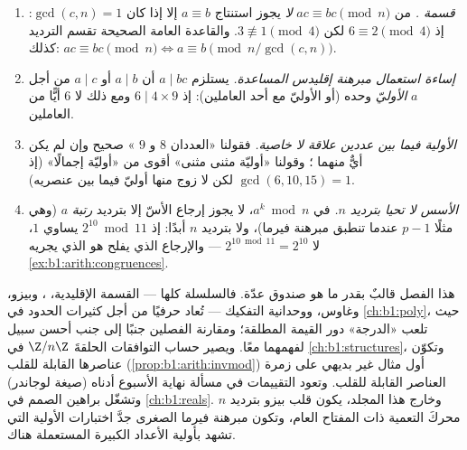 \begin{remark}\label{rem:b1:arith:pitfalls}
\begin{enumerate}
  \item \emph{قسمة .} من $ac \equiv bc \pmod n$
        \emph{لا} يجوز استنتاج $a \equiv b$ إلا إذا كان $\gcd(c,
        n) = 1$: إذ $6 \equiv 2 \pmod 4$ لكن $3 \not\equiv 1 \pmod
        4$. والقاعدة العامة الصحيحة تقسم الترديد كذلك: $ac
        \equiv bc \pmod n \iff a \equiv b \pmod{n/\gcd(c,n)}$.
  \item \emph{إساءة استعمال مبرهنة إقليدس المساعدة.} يستلزم $a \mid bc$ أن $a
        \mid b$ أو $a \mid c$ من أجل $a$ \emph{الأوليّ} وحده (أو
        الأوليّ مع أحد العاملين): إذ $6 \mid 4 \times 9$ ومع ذلك لا  $6$
        أيًّا من العاملين.
  \item \emph{الأولية فيما بين عددين علاقة لا خاصية.} فقولنا «العددان $8$ و
        $9$ » صحيح وإن لم يكن أيٌّ منهما ؛
        وقولنا «أوليّة مثنى مثنى» أقوى من «أوليّة
        إجمالًا» (إذ $\gcd(6, 10, 15) = 1$ لكن لا زوج منها
        أوليّ فيما بين عنصريه).
  \item \emph{الأسس لا تحيا بترديد $n$.} في $a^k \bmod n$،
        لا يجوز إرجاع الأسّ إلا بترديد \emph{رتبة}
        $a$ (وهي مثلًا $p - 1$ عندما تنطبق مبرهنة فيرما)، ولا
        بترديد $n$ أبدًا: إذ $2^{10} \bmod 11$ يساوي $1$، لا $2^{10 \bmod
        11} = 2^{10}$ --- والإرجاع الذي يفلح هو الذي
        يجريه \cref{ex:b1:arith:congruences}.
\end{enumerate}
\end{remark}

\begin{remark}\label{rem:b1:arith:whereused}
هذا الفصل قالبٌ بقدر ما هو صندوق عدّة. فالسلسلة كلها
--- القسمة الإقليدية، ، وبيزو، وغاوس، ووحدانية التفكيك
--- تُعاد حرفيًا من أجل كثيرات الحدود في \cref{ch:b1:poly}،
حيث تلعب «الدرجة» دور القيمة المطلقة؛ ومقارنة
الفصلين جنبًا إلى جنب أحسن سبيل لفهمهما معًا. ويصير
حساب التوافقات الحلقةَ $\Z/n\Z$ في
\cref{ch:b1:structures}، وتكوّن عناصرها القابلة للقلب
(\cref{prop:b1:arith:invmod}) أول مثال غير بديهي على
زمرة العناصر القابلة للقلب. وتعود التقييمات في مسألة نهاية الأسبوع أدناه
(صيغة لوجاندر) وتشغّل براهين الصمم في
\cref{ch:b1:reals}. وخارج هذا المجلد، يكون قلب بيزو بترديد $n$
محركَ التعمية ذات المفتاح العام، وتكون مبرهنة فيرما
الصغرى جدَّ اختبارات الأولية التي تشهد بأولية
الأعداد الكبيرة المستعملة هناك.
\end{remark}

